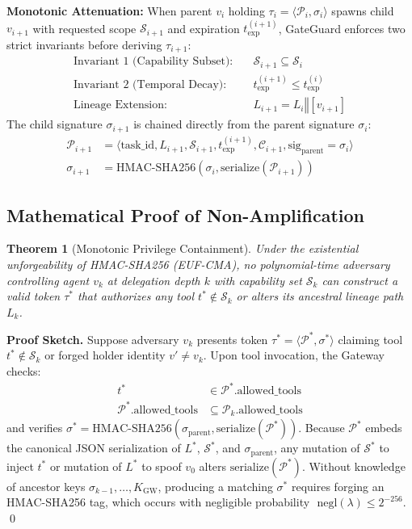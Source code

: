 \documentclass[10pt,twocolumn,a4paper]{article}
\newtheorem{theorem}{Theorem}
\begin{document}
\textbf{Monotonic Attenuation:} When parent $v_i$ holding $\tau_i = \langle \mathcal{P}_i, \sigma_i \rangle$ spawns child $v_{i+1}$ with requested scope $\mathcal{S}_{i+1}$ and expiration $t_{\text{exp}}^{(i+1)}$, GateGuard enforces two strict invariants before deriving $\tau_{i+1}$:
\begin{align}
    \text{Invariant 1 (Capability Subset):} \quad &\mathcal{S}_{i+1} \subseteq \mathcal{S}_i \\
    \text{Invariant 2 (Temporal Decay):} \quad &t_{\text{exp}}^{(i+1)} \le t_{\text{exp}}^{(i)} \\
    \text{Lineage Extension:} \quad &L_{i+1} = L_i \mathbin{\Vert} [v_{i+1}]
\end{align}
The child signature $\sigma_{i+1}$ is chained directly from the parent signature $\sigma_i$:
\begin{align}
    \mathcal{P}_{i+1} &= \langle \text{task\_id}, L_{i+1}, \mathcal{S}_{i+1}, t_{\text{exp}}^{(i+1)}, \mathcal{C}_{i+1}, \text{sig}_{\text{parent}}=\sigma_i \rangle \\
    \sigma_{i+1} &= \text{HMAC-SHA256}(\sigma_i, \text{serialize}(\mathcal{P}_{i+1}))
\end{align}

\subsection{Mathematical Proof of Non-Amplification}
\begin{theorem}[Monotonic Privilege Containment]
Under the existential unforgeability of HMAC-SHA256 (EUF-CMA), no polynomial-time adversary controlling agent $v_k$ at delegation depth $k$ with capability set $\mathcal{S}_k$ can construct a valid token $\tau^*$ that authorizes any tool $t^* \notin \mathcal{S}_k$ or alters its ancestral lineage path $L_k$.
\end{theorem}

\textbf{Proof Sketch.} Suppose adversary $v_k$ presents token $\tau^* = \langle \mathcal{P}^*, \sigma^* \rangle$ claiming tool $t^* \notin \mathcal{S}_k$ or forged holder identity $v' \ne v_k$. Upon tool invocation, the Gateway checks:
\begin{align*}
    t^* &\in \mathcal{P}^*.\text{allowed\_tools} \\
    \mathcal{P}^*.\text{allowed\_tools} &\subseteq \mathcal{P}_k.\text{allowed\_tools}
\end{align*}
and verifies $\sigma^* = \text{HMAC-SHA256}(\sigma_{\text{parent}}, \text{serialize}(\mathcal{P}^*))$. Because $\mathcal{P}^*$ embeds the canonical JSON serialization of $L^*$, $\mathcal{S}^*$, and $\sigma_{\text{parent}}$, any mutation of $\mathcal{S}^*$ to inject $t^*$ or mutation of $L^*$ to spoof $v_0$ alters $\text{serialize}(\mathcal{P}^*)$. Without knowledge of ancestor keys $\sigma_{k-1}, \dots, K_{\text{GW}}$, producing a matching $\sigma^*$ requires forging an HMAC-SHA256 tag, which occurs with negligible probability $\text{ negl}(\lambda) \le 2^{-256}$. \qed
\end{document}
